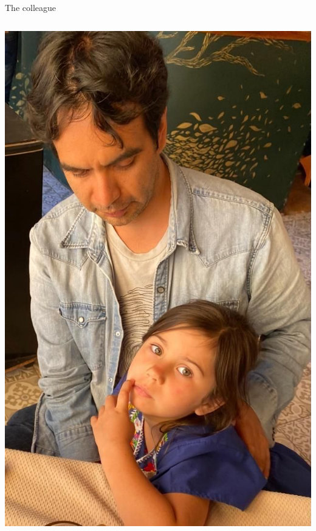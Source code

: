 \documentclass[bigger]{beamer}
\begin{document}
\begin{frame}[label={sec:org1673f13}]{The colleague}
\begin{columns}
\begin{column}{0.5\columnwidth}
\includegraphics[width=.75\textwidth]{../../cantu-pics/cantu-y-sol.jpeg}
\end{column}
\end{columns}
\end{frame}
\end{document}
